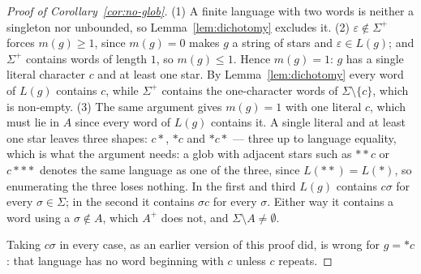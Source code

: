 \begin{proof}[Proof of Corollary~\ref{cor:no-glob}]
(1) A finite language with two words is neither a singleton nor unbounded, so
Lemma~\ref{lem:dichotomy} excludes it. (2) $\varepsilon\notin\Sigma^{+}$ forces
$m(g)\ge 1$, since $m(g)=0$ makes $g$ a string of stars and $\varepsilon\in L(g)$; and
$\Sigma^{+}$ contains words of length $1$, so $m(g)\le 1$. Hence $m(g)=1$: $g$ has a
single literal character $c$ and at least one star. By Lemma~\ref{lem:dichotomy} every
word of $L(g)$ contains $c$, while $\Sigma^{+}$ contains the one-character words of
$\Sigma\setminus\{c\}$, which is non-empty. (3) The same argument gives $m(g)=1$ with one
literal $c$, which must lie in $A$ since every word of $L(g)$ contains it. A single
literal and at least one star leaves three shapes: $c{*}$, ${*}c$ and ${*}c{*}$ ---
three up to language equality, which is what the argument needs: a glob with adjacent
stars such as ${*}{*}c$ or $c{*}{*}{*}$ denotes the same language as one of the three,
since $L({*}{*})=L({*})$, so enumerating the three loses nothing. In the
first and third $L(g)$ contains $c\sigma$ for every $\sigma\in\Sigma$; in the second it
contains $\sigma c$ for every $\sigma$. Either way it contains a word using a
$\sigma\notin A$, which $A^{+}$ does not, and $\Sigma\setminus A\neq\emptyset$.

Taking $c\sigma$ in every case, as an earlier version of this proof did, is wrong for
$g={*}c$: that language has no word beginning with $c$ unless $c$ repeats.
\end{proof}
